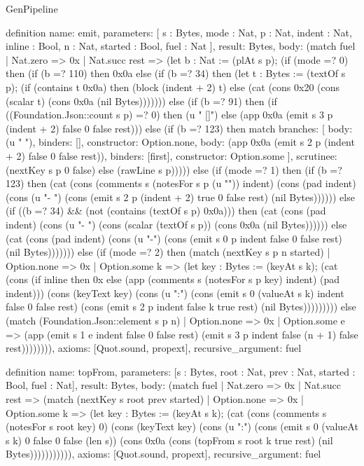 \begin{lexlean}{GenPipeline}
\begin{semanticmodule}
definition{
  name: emit,
  parameters: [
    s : Bytes,
    mode : Nat,
    p : Nat,
    indent : Nat,
    inline : Bool,
    n : Nat,
    started : Bool,
    fuel : Nat
  ],
  result: Bytes,
  body: (match fuel
    | Nat.zero => 0x
    | Nat.succ rest => (let b : Nat := (plAt s p); (if (mode =? 0) then (if (b =? 110) then 0x0a else (if (b =? 34) then (let t : Bytes := (textOf s p); (if (contains t 0x0a) then (block (indent + 2) t) else (cat (cons 0x20 (cons (scalar t) (cons 0x0a (nil Bytes))))))) else (if (b =? 91) then (if ((Foundation.Json::count s p) =? 0) then (u " []\n") else (app 0x0a (emit s 3 p (indent + 2) false 0 false rest))) else (if (b =? 123) then match{
      branches: [
        {body: (u " {}\n"), binders: [], constructor: Option.none},
        {
          body: (app 0x0a (emit s 2 p (indent + 2) false 0 false rest)),
          binders: [first],
          constructor: Option.some
        }
      ],
      scrutinee: (nextKey s p 0 false)
    } else (rawLine s p))))) else (if (mode =? 1) then (if (b =? 123) then (cat (cons (comments s (notesFor s p (u "")) indent) (cons (pad indent) (cons (u "- ") (cons (emit s 2 p (indent + 2) true 0 false rest) (nil Bytes)))))) else (if ((b =? 34) && (not (contains (textOf s p) 0x0a))) then (cat (cons (pad indent) (cons (u "- ") (cons (scalar (textOf s p)) (cons 0x0a (nil Bytes)))))) else (cat (cons (pad indent) (cons (u "-") (cons (emit s 0 p indent false 0 false rest) (nil Bytes))))))) else (if (mode =? 2) then (match (nextKey s p n started)
      | Option.none => 0x
      | Option.some k => (let key : Bytes := (keyAt s k); (cat (cons (if inline then 0x else (app (comments s (notesFor s p key) indent) (pad indent))) (cons (keyText key) (cons (u ":") (cons (emit s 0 (valueAt s k) indent false 0 false rest) (cons (emit s 2 p indent false k true rest) (nil Bytes))))))))) else (match (Foundation.Json::element s p n)
      | Option.none => 0x
      | Option.some e => (app (emit s 1 e indent false 0 false rest) (emit s 3 p indent false (n + 1) false rest)))))))),
  axioms: [Quot.sound, propext],
  recursive_argument: fuel
}

definition{
  name: topFrom,
  parameters: [s : Bytes, root : Nat, prev : Nat, started : Bool, fuel : Nat],
  result: Bytes,
  body: (match fuel
    | Nat.zero => 0x
    | Nat.succ rest => (match (nextKey s root prev started)
      | Option.none => 0x
      | Option.some k => (let key : Bytes := (keyAt s k); (cat (cons (comments s (notesFor s root key) 0) (cons (keyText key) (cons (u ":") (cons (emit s 0 (valueAt s k) 0 false 0 false (len s)) (cons 0x0a (cons (topFrom s root k true rest) (nil Bytes))))))))))),
  axioms: [Quot.sound, propext],
  recursive_argument: fuel
}


\end{semanticmodule}
\end{lexlean}
